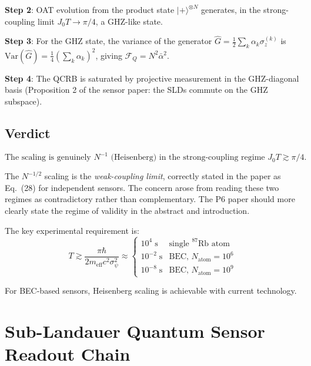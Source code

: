 \documentclass[11pt]{article}
\theoremstyle{definition}
\theoremstyle{remark}
\begin{document}
\textbf{Step 2}: OAT evolution from the product state
$|{+}\rangle^{\otimes N}$ generates, in the strong-coupling limit
$J_0 T \to \pi/4$, a GHZ-like state.

\textbf{Step 3}: For the GHZ state, the variance of the generator
$\hat{G} = \frac{1}{2}\sum_k \alpha_k \sigma_z^{(k)}$ is
$\mathrm{Var}(\hat{G}) = \frac{1}{4}(\sum_k \alpha_k)^2$, giving
$\mathcal{F}_Q = N^2\bar{\alpha}^2$.

\textbf{Step 4}: The QCRB is saturated by projective measurement in
the GHZ-diagonal basis (Proposition 2 of the sensor paper: the SLDs
commute on the GHZ subspace).

\subsection{Verdict}

\begin{equation}
\boxed{\text{The scaling is genuinely } N^{-1} \text{ (Heisenberg) in the
strong-coupling regime } J_0 T \gtrsim \pi/4.}
\end{equation}

The $N^{-1/2}$ scaling is the \emph{weak-coupling limit}, correctly
stated in the paper as Eq.~(28) for independent sensors. The concern
arose from reading these two regimes as contradictory rather than
complementary. The P6 paper should more clearly state the regime of
validity in the abstract and introduction.

The key experimental requirement is:
\begin{equation}
T \gtrsim \frac{\pi\hbar}{2 m_{\mathrm{eff}} c^2 \sigma_\psi^2}
\approx \begin{cases}
10^4\;\mathrm{s} & \text{single }^{87}\text{Rb atom} \\
10^{-2}\;\mathrm{s} & \text{BEC, } N_{\mathrm{atom}} = 10^6 \\
10^{-8}\;\mathrm{s} & \text{BEC, } N_{\mathrm{atom}} = 10^9
\end{cases}
\end{equation}

For BEC-based sensors, Heisenberg scaling is achievable with current
technology.

\section{Sub-Landauer Quantum Sensor Readout Chain}
\label{sec:sub-landauer-readout}
\end{document}
